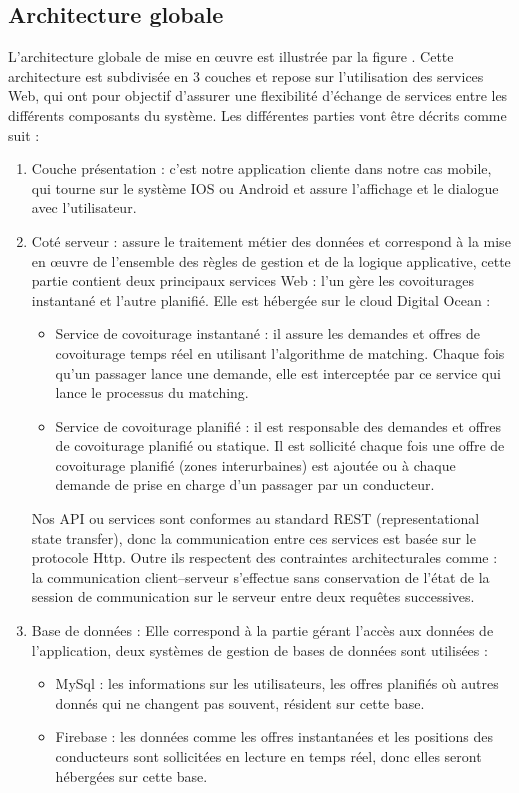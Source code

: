 \subsection{Architecture globale} %
\label{ssub:architecture_globale}
L’architecture globale de mise en œuvre est illustrée par la figure . Cette architecture est subdivisée en 3 couches et repose sur l’utilisation des services Web, qui ont pour objectif d’assurer une flexibilité d’échange de services entre les différents composants du système.\newline
Les différentes parties vont être décrits comme suit :
\begin{enumerate}
	\item Couche présentation : c'est notre application cliente dans notre cas mobile, qui tourne sur le système IOS ou Android et assure l'affichage et le dialogue avec l'utilisateur.
	\item Coté serveur : assure le traitement métier des données et correspond à la mise en œuvre de l'ensemble des règles de gestion et de la logique applicative, cette partie contient deux principaux services Web : l'un gère les covoiturages instantané et l'autre planifié. Elle est hébergée sur le cloud Digital Ocean :
	\begin{itemize}
		\item Service de covoiturage instantané : il assure les demandes et offres de covoiturage temps réel en utilisant l'algorithme de matching. Chaque fois qu'un passager lance une demande, elle est interceptée par ce service qui lance le processus du matching. 
		\item Service de covoiturage planifié : il est responsable des demandes et offres de covoiturage planifié ou statique. Il est sollicité chaque fois une offre de covoiturage planifié (zones interurbaines) est ajoutée ou à chaque demande de prise en charge d'un passager par un conducteur.
	\end{itemize}
	Nos API ou services sont conformes au standard REST (representational state transfer), donc la communication entre ces services est basée sur le protocole Http. Outre ils respectent des contraintes architecturales comme : la communication client–serveur s'effectue sans conservation de l'état de la session de communication sur le serveur entre deux requêtes successives.\cite{fielding2000architectural}
	\item Base de données : Elle correspond à la partie gérant l'accès aux données de l'application, deux systèmes de gestion de bases de données sont utilisées :
	\begin{itemize}
		\item MySql : les informations sur les utilisateurs, les offres planifiés où autres donnés qui ne changent pas souvent, résident sur cette base.
		\item Firebase : les données comme les offres instantanées et les positions des conducteurs sont sollicitées en lecture en temps réel, donc elles seront hébergées sur cette base.
	\end{itemize}
\end{enumerate}
\clearpage
